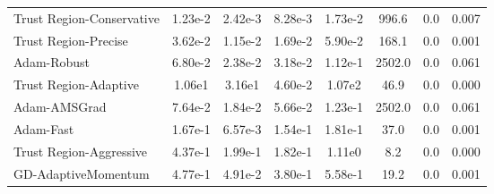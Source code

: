 \documentclass{article}
\begin{document}
\begin{table}[htbp]
{\begin{tabular}{p{2.5cm}*{7}{c}}
Trust Region-Conservative & 1.23e-2 & 2.42e-3 & 8.28e-3 & 1.73e-2 & 996.6 & 0.0 & 0.007 \\
Trust Region-Precise & 3.62e-2 & 1.15e-2 & 1.69e-2 & 5.90e-2 & 168.1 & 0.0 & 0.001 \\
Adam-Robust & 6.80e-2 & 2.38e-2 & 3.18e-2 & 1.12e-1 & 2502.0 & 0.0 & 0.061 \\
Trust Region-Adaptive & 1.06e1 & 3.16e1 & 4.60e-2 & 1.07e2 & 46.9 & 0.0 & 0.000 \\
Adam-AMSGrad & 7.64e-2 & 1.84e-2 & 5.66e-2 & 1.23e-1 & 2502.0 & 0.0 & 0.061 \\
Adam-Fast & 1.67e-1 & 6.57e-3 & 1.54e-1 & 1.81e-1 & 37.0 & 0.0 & 0.001 \\
Trust Region-Aggressive & 4.37e-1 & 1.99e-1 & 1.82e-1 & 1.11e0 & 8.2 & 0.0 & 0.000 \\
GD-AdaptiveMomentum & 4.77e-1 & 4.91e-2 & 3.80e-1 & 5.58e-1 & 19.2 & 0.0 & 0.001 \\
\bottomrule
\end{tabular}
}
\end{table}
\end{document}
